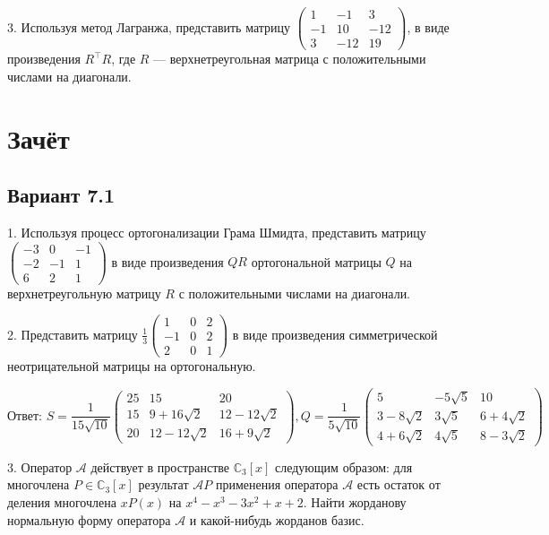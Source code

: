 \documentclass[a4paper]{article}
\newcommand{\No}{\textnumero}
\begin{document}
3. Используя метод Лагранжа, представить матрицу $\left(
\begin{array}{rrr}
1 & -1 & 3 \\
-1 & 10 & -12 \\
3 & -12 & 19
\end{array}
\right)$, в виде произведения $R^\top R$, где $R$ ---
верхнетреугольная матрица с положительными числами на диагонали.

\section{Зачёт \No 3}

\subsection{Вариант 7.1}

1. Используя процесс ортогонализации Грама Шмидта, представить
мат\-ри\-цу $\left(
\begin{array}{rrr}
-3 & 0 & -1 \\
-2 & -1 & 1 \\
6 & 2 & 1
\end{array}
\right) $ в виде произведения $QR$ ортогональной матрицы $Q$ на
верхнетреугольную матрицу $R$ с положительными числами на
диагонали.

2. Представить матрицу $\displaystyle\frac{1}{3}\left(
\begin{array}{rrr}
1 & 0 & 2 \\
-1 & 0 & 2 \\
2 & 0 & 1
\end{array}\right)
$ в виде произведения симметрической неотрицательной матрицы на
ортогональную.

$$
\textit{Ответ:\ } S=\displaystyle\frac{1}{15\sqrt{10}} \left(
\begin{array}{ccc}
25 & 15 & 20 \\
15 & 9+16\sqrt 2 & 12-12\sqrt 2 \\
20 & 12-12\sqrt 2 & 16+9\sqrt 2
\end{array}
\right), Q=\displaystyle\frac{1}{5\sqrt{10}}\left(
\begin{array}{ccc}
5 & -5\sqrt 5 & 10 \\
3-8\sqrt 2 & 3\sqrt 5 & 6+4\sqrt 2 \\
4+6\sqrt 2 & 4\sqrt 5 & 8-3\sqrt 2
\end{array}
\right)
$$

3. Оператор $\mathcal{A}$ действует в пространстве
$\mathbb{C}_3[x]$ следующим образом: для многочлена
$P\in\mathbb{C}_3[x]$ результат $\mathcal{A}P$ применения
оператора $\mathcal{A}$ есть остаток от деления многочлена $xP(x)$
на $x^4-x^3-3x^2+x+2$. Найти жорданову нормальную форму оператора
$\mathcal{A}$ и какой-нибудь жорданов базис.
\end{document}
